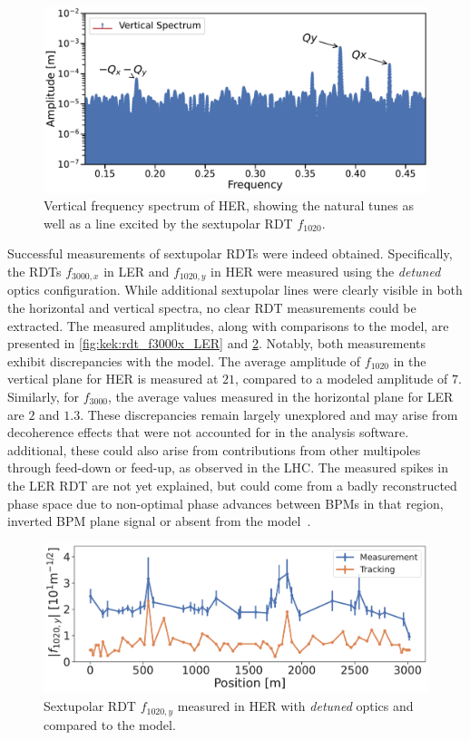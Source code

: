 \begin{figure}[!htb]
    \centering
    \includegraphics[width=0.8\linewidth]{images/kek/HER_2024-02-06_sextupoles_spectrum.pdf}
    \caption{Vertical frequency spectrum of HER, showing the natural tunes as well as a line
    excited by the sextupolar RDT $f_{1020}$.}
    \label{fig:kek:rdt_spectrum_HER}
\end{figure}

Successful measurements of sextupolar RDTs were indeed obtained. Specifically,
the RDTs $f_{3000,x}$ in LER and $f_{1020,y}$ in HER were measured using the
\textit{detuned} optics configuration. While additional sextupolar lines were clearly visible in
both the horizontal and vertical spectra, no clear RDT measurements could be extracted. The measured
amplitudes, along with comparisons to the model, are presented in \cref{fig:kek:rdt_f3000x_LER} and
\cref{fig:kek:rdt_f1020y_HER}. Notably, both measurements exhibit discrepancies with the model. 
The average amplitude of $f_{1020}$ in the vertical plane for HER is measured at $21$, compared to a
modeled amplitude of $7$. Similarly, for $f_{3000}$, the average values measured in the horizontal
plane for LER are $2$ and $1.3$. These discrepancies remain largely unexplored and may arise from
decoherence effects that were not accounted for in the analysis software. additional, these could
also arise from contributions from other multipoles through feed-down or feed-up, as observed in the
LHC. The measured spikes in the LER RDT are not yet explained, but could come from a badly
reconstructed phase space due to non-optimal phase advances between BPMs in that region, inverted
BPM plane signal or absent from the model~\cite{frank2024private}.

\begin{figure}[!htb]
    \centering
    \includegraphics[width=0.8\linewidth]{images/kek/f1020y_HER.pdf}
    \caption{Sextupolar RDT $f_{1020,y}$ measured in HER with \textit{detuned} optics and compared to 
    the model.}
    \label{fig:kek:rdt_f1020y_HER}
\end{figure}


